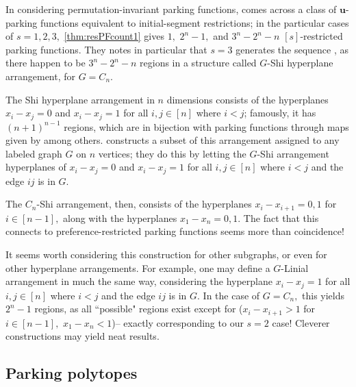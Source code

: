 \documentclass[12 pt]{amsart}
\theoremstyle{definition} %
\theoremstyle{remark} %
\begin{document}
In considering permutation-invariant parking functions, \cite{chen-2023} comes across a class of $\mathbf{u}$-parking functions equivalent to initial-segment restrictions; in the particular cases of $s=1,2,3,$ \cref{thm:resPFcount1} gives $1,$ $2^n-1,$ and $3^n-2^n-n$ $[s]$-restricted parking functions. They notes in particular that $s=3$ generates the sequence \cite[A001263]{oeis}, as there happen to be $3^n-2^n-n$ regions in a structure called $G$-Shi hyperplane arrangement, for $G=C_n.$

The Shi hyperplane arrangement in $n$ dimensions consists of the hyperplanes $x_i-x_j=0$ and $x_i-x_j=1$ for all $i,j\in[n]$ where $i<j$; famously, it has $(n+1)^{n-1}$ regions, which are in bijection with parking functions through maps given by \cite{athanasiadis-linusson-1999} among others. \cite{bennett-2024} constructs a subset of this arrangement assigned to any labeled graph $G$ on $n$ vertices; they do this by letting the $G$-Shi arrangement hyperplanes of $x_i-x_j=0$ and $x_i-x_j=1$ for all $i,j\in[n]$ where $i<j$ and the edge $ij$ is in $G.$

The $C_n$-Shi arrangement, then, consists of the hyperplanes $x_i-x_{i+1}=0,1$ for $i\in[n-1],$ along with the hyperplanes $x_1-x_n=0,1.$ The fact that this connects to preference-restricted parking functions seems more than coincidence!

It seems worth considering this construction for other subgraphs, or even for other hyperplane arrangements. For example, one may define a $G$-Linial arrangement in much the same way, considering the hyperplane $x_i-x_j=1$ for all $i,j\in[n]$ where $i<j$ and the edge $ij$ is in $G.$ In the case of $G=C_n,$ this yields $2^n-1$ regions, as all ``possible" regions exist except for ($x_i-x_{i+1}>1$ for $i\in[n-1],$ $x_1-x_n<1$)-- exactly corresponding to our $s=2$ case! Cleverer constructions may yield neat results.

\subsection{Parking polytopes}



\end{document}
